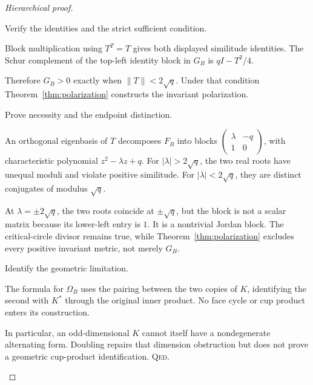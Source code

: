 \documentclass[11pt,a4paper]{article}
\theoremstyle{remark}\newtheorem{remark}[definition]{Remark}
\newcommand{\QED}{\textsc{Qed}}
\begin{document}
\begin{proof}[Hierarchical proof]
\begin{steps}
\item Verify the identities and the strict sufficient condition.
\begin{steps}
\item Block multiplication using $T^T=T$ gives both displayed similitude identities. The Schur complement of the top-left identity block in $G_B$ is $qI-T^2/4$.
\item Therefore $G_B>0$ exactly when $\|T\|<2\sqrt q$. Under that condition Theorem~\ref{thm:polarization} constructs the invariant polarization.
\end{steps}
\item Prove necessity and the endpoint distinction.
\begin{steps}
\item An orthogonal eigenbasis of $T$ decomposes $F_B$ into blocks $\left(\begin{smallmatrix}\lambda&-q\\1&0\end{smallmatrix}\right)$, with characteristic polynomial $z^2-\lambda z+q$. For $|\lambda|>2\sqrt q$, the two real roots have unequal moduli and violate positive similitude. For $|\lambda|<2\sqrt q$, they are distinct conjugates of modulus $\sqrt q$.
\item At $\lambda=\pm2\sqrt q$, the two roots coincide at $\pm\sqrt q$, but the block is not a scalar matrix because its lower-left entry is $1$. It is a nontrivial Jordan block. The critical-circle divisor remains true, while Theorem~\ref{thm:polarization} excludes every positive invariant metric, not merely $G_B$.
\end{steps}
\item Identify the geometric limitation.
\begin{steps}
\item The formula for $\Omega_B$ uses the pairing between the two copies of $K$, identifying the second with $K^*$ through the original inner product. No face cycle or cup product enters its construction.
\item In particular, an odd-dimensional $K$ cannot itself have a nondegenerate alternating form. Doubling repairs that dimension obstruction but does not prove a geometric cup-product identification. \QED.
\end{steps}
\end{steps}
\end{proof}
\end{document}
